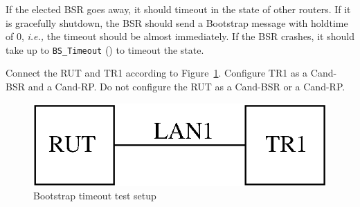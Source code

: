 \documentclass[11pt]{report}
\newcommand{\ie}{\emph{i.e.,}\xspace}
\begin{document}
If the elected BSR goes away, it should timeout in the
state of other routers. If it is gracefully shutdown, the BSR should send a
Bootstrap message with holdtime of 0, \ie the timeout should be almost
immediately.
If the BSR crashes, it should take up to \verb=BS_Timeout= ({\PimsmBSTimeout})
to timeout the state.

Connect the RUT and TR1 according to Figure~\ref{fig:bootstrap_timeout}.
Configure TR1 as a Cand-BSR and a Cand-RP. Do not configure the RUT as a
Cand-BSR or a Cand-RP.

\begin{figure}[htbp]
  \begin{center}
    \includegraphics[scale=0.8]{figs/pim_test_6_3_bootstrap_timeout}
    \caption{Bootstrap timeout test setup}
    \label{fig:bootstrap_timeout}
  \end{center}
\end{figure}
\end{document}
